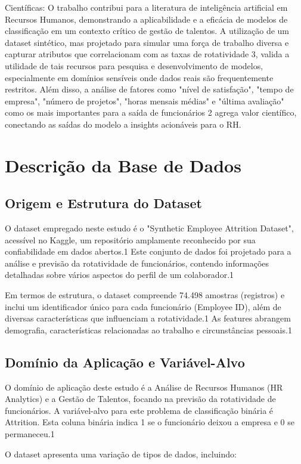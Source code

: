 \documentclass[sigconf]{acmart}
\begin{document}
Científicas: O trabalho contribui para a literatura de inteligência artificial em Recursos Humanos, demonstrando a aplicabilidade e a eficácia de modelos de classificação em um contexto crítico de gestão de talentos. A utilização de um dataset sintético, mas projetado para simular uma força de trabalho diversa e capturar atributos que correlacionam com as taxas de rotatividade 3, valida a utilidade de tais recursos para pesquisa e desenvolvimento de modelos, especialmente em domínios sensíveis onde dados reais são frequentemente restritos. Além disso, a análise de fatores como "nível de satisfação", "tempo de empresa", "número de projetos", "horas mensais médias" e "última avaliação" como os mais importantes para a saída de funcionários 2 agrega valor científico, conectando as saídas do modelo a insights acionáveis para o RH.

\section{Descrição da Base de Dados}
\subsection{Origem e Estrutura do Dataset}
O dataset empregado neste estudo é o "Synthetic Employee Attrition Dataset", acessível no Kaggle, um repositório amplamente reconhecido por sua confiabilidade em dados abertos.1 Este conjunto de dados foi projetado para a análise e previsão da rotatividade de funcionários, contendo informações detalhadas sobre vários aspectos do perfil de um colaborador.1

Em termos de estrutura, o dataset compreende 74.498 amostras (registros) e inclui um identificador único para cada funcionário (Employee ID), além de diversas características que influenciam a rotatividade.1 As features abrangem demografia, características relacionadas ao trabalho e circunstâncias pessoais.1

\subsection{Domínio da Aplicação e Variável-Alvo}
O domínio de aplicação deste estudo é a Análise de Recursos Humanos (HR Analytics) e a Gestão de Talentos, focando na previsão da rotatividade de funcionários. A variável-alvo para este problema de classificação binária é Attrition. Esta coluna binária indica 1 se o funcionário deixou a empresa e 0 se permaneceu.1

O dataset apresenta uma variação de tipos de dados, incluindo:
\end{document}

